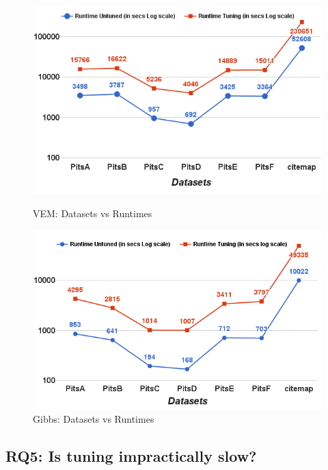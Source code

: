 \documentclass[10pt,conference]{IEEEtran}
\theoremstyle{break}
\begin{document}
\begin{figure}[!t]
    \centering
  \begin{minipage}{.49\textwidth}
        \captionsetup{labelsep=space,justification=centering,singlelinecheck=off}
        \includegraphics[width=\linewidth]{./fig/Run_VEM_sci.png}
  \caption{VEM: Datasets vs Runtimes}
  \label{RQ5 VEM}
  \end{minipage}
  \begin{minipage}{.49\textwidth}
        \captionsetup{justification=centering,singlelinecheck=off}
        \includegraphics[width=\linewidth]{./fig/Run_gibbs_sci.png}
  \caption{Gibbs: Datasets vs Runtimes}
  \label{RQ5 Gibbs}
    \end{minipage}%
    
\end{figure}

\subsection{\textbf{RQ5: Is tuning impractically slow?}}
\end{document}
